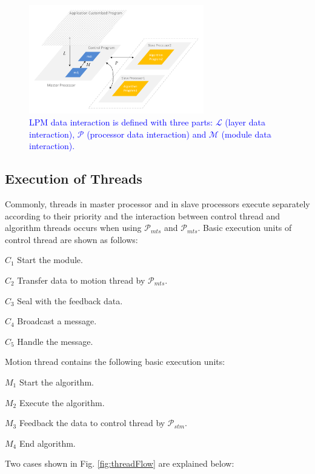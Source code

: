 \documentclass[journal,UTF8]{IEEEtran}
\begin{document}
 \begin{figure}
	\centering
	\includegraphics[width=3in]{fig/Interaction.pdf}
	\caption{ \textcolor{blue}{LPM data interaction is defined with three parts: $\mathcal{L}$ (layer data interaction), $\mathcal{P}$ (processor data interaction) and $\mathcal{M}$ (module data interaction).}}
	\label{fig:Interaction}
\end{figure}

 \subsection{Execution of Threads}
 Commonly, threads in master processor and in slave processors execute separately according to their priority and the interaction between control thread and algorithm threads occurs when using $\mathcal{P}_{mts}$ and $\mathcal{P}_{mts}$. Basic execution units of control thread are shown as follows:
 
 \textbf{$C_{1}$} Start the module.
 
 \textbf{$C_{2}$} Transfer data to motion thread by $\mathcal{P}_{mts}$.
 
 \textbf{$C_{3}$} Seal with the feedback data.
 
 \textbf{$C_{4}$} Broadcast a message.
 
  \textbf{$C_{5}$} Handle the message.
  
 Motion thread contains the following basic execution units:
 
 \textbf{$M_{1}$} Start the algorithm.
 
 \textbf{$M_{2}$} Execute the algorithm.
 
 \textbf{$M_{3}$} Feedback the data to control thread by $\mathcal{P}_{stm}$.
 
 \textbf{$M_{4}$} End algorithm.
  
  Two cases shown in Fig. \ref{fig:threadFlow} are explained below:
  
\end{document}
